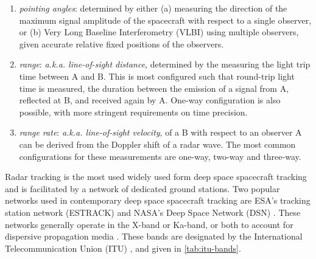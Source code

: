 \begin{enumerate}
    \item \textit{pointing angles}: determined by either (a) measuring the
          direction of the maximum signal amplitude of the spacecraft with respect to
          a single observer, or (b) Very Long Baseline Interferometry (VLBI) using
          multiple observers, given accurate relative fixed positions of the
          observers.
    \item \textit{range}: \textit{a.k.a. line-of-sight distance}, determined by
          the measuring the light trip time between A and B. This is most configured
          such that round-trip light time is measured, the duration between the
          emission of a signal from A, reflected at B, and received again by A.
          One-way configuration is also possible, with more stringent requirements on
          time precision.
    \item \textit{range rate}: \textit{a.k.a. line-of-sight velocity}, of
          a B with respect to an observer A can be derived from the Doppler shift
          of a radar wave. The most common configurations for these measurements are
          one-way, two-way and three-way.
\end{enumerate}

Radar tracking is the most used widely used form deep space spacecraft tracking
and is facilitated by a network of dedicated ground stations. Two popular
networks used in contemporary deep space spacecraft tracking are ESA's tracking
station network (ESTRACK) \cite{Doat2018} and NASA's Deep Space Network (DSN)
\cite{Dsn2015}. These networks generally operate in the X-band or Ka-band, or
both to account for dispersive propagation media \cite{Bertotti1993}. These
bands are designated by the International Telecommunication Union (ITU)
\cite{Berner2020}, and given in \autoref{tab:itu-bands}.

